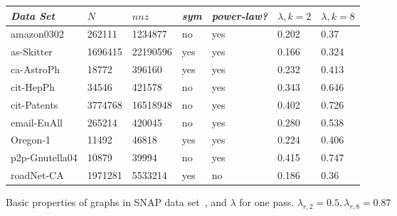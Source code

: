 \begin{figure}
\caption{Basic properties of graphs in SNAP data set~\cite{Leskovec-data}, and $\lambda$ for one pass. $\lambda_{r,2}=0.5,\lambda_{r,8}=0.87$}
\centering
{ \begin{tabular}{ *7l }    \toprule
\label{table:big}
\emph{Data Set} & $N$ & $nnz$ & \emph{sym} & \emph{power-law?} & $\lambda, k=2$ & $\lambda, k=8$ \\\midrule
amazon0302 & 262111 & 1234877 & no & yes & 0.202&0.37\\
as-Skitter & 1696415 & 22190596 & yes & yes & 0.166&0.324\\
ca-AstroPh & 18772 & 396160 & yes & yes & 0.232&0.413\\
cit-HepPh & 34546 & 421578 & no & yes & 0.343&0.646\\
cit-Patents & 3774768 & 16518948 & no & yes & 0.402&0.726\\
email-EuAll & 265214 & 420045 & no & yes & 0.280&0.538\\
Oregon-1 & 11492 & 46818 & yes & yes & 0.224&0.406\\
p2p-Gnutella04 & 10879 & 39994 & no & yes & 0.415&0.747\\
roadNet-CA & 1971281 & 5533214 & yes & no & 0.186&0.36\\

\end{tabular}}
\end{figure}
